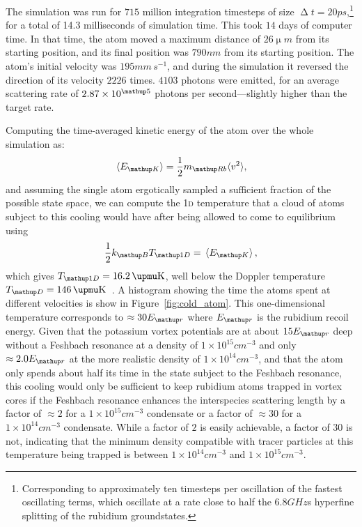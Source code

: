 The simulation was run for $715$ million integration timesteps of size $\upDelta t=20\unit{ps}$,\footnote{Corresponding to approximately ten timesteps per oscillation of the fastest oscillating terms, which oscillate at a rate close to half the $6.8\unit{GHz}$s hyperfine splitting of the rubidium groundstates.} for a total of 14.3 milliseconds of simulation time. This took $14$ days of computer time. In that time, the atom moved a maximum distance of $26\unit{\upmu m}$ from its starting position, and its final position was $790\unit{nm}$ from its starting position. The atom's initial velocity was $195 \unit{mm\,s}^{-1}$, and during the simulation it reversed the direction of its velocity $2226$ times. $4103$ photons were emitted, for an average scattering rate of $2.87\times10^\up{5}$ photons per second---slightly higher than the target rate.

Computing the time-averaged kinetic energy of the atom over the whole simulation as:
\begin{equation}
\ev{E_\up{K}} = \frac12 m_\up{Rb} \langle v^2 \rangle,
\end{equation}
and assuming the single atom ergotically sampled a sufficient fraction of the possible state space, we can compute the \textsc{1d} temperature that a cloud of atoms subject to this cooling would have after being allowed to come to equilibrium using
\begin{align}
\frac12 k_\up{B} T_\up{1D} = \ev{E_\up{K}},
\end{align}
which gives  $T_\up{1D} = 16.2\unit{\upmu K}$, well below the Doppler temperature $T_\up{D} = 146\unit{\upmu K}$~\cite{steck_rubidium_2015}. A histogram showing the time the atoms spent at different velocities is show in Figure~\ref{fig:cold_atom}. This one-dimensional temperature corresponds to $\approx30E_\up{r}$ where $E_\up{r}$ is the rubidium recoil energy. Given that the potassium vortex potentials are at about $15E_\up{r}$ deep without a Feshbach resonance at a density of $1\times10^{15}\unit{cm}^{-3}$ and only $\approx 2.0E_\up{r}$ at the more realistic density of $1\times10^{14}\unit{cm}^{-3}$, and that the atom only spends about half its time in the state subject to the Feshbach resonance, this cooling would only be sufficient to keep rubidium atoms trapped in vortex cores if the Feshbach resonance enhances the interspecies scattering length by a factor of $\approx 2$ for a $1\times10^{15}\unit{cm}^{-3}$ condensate or a factor of $\approx 30$ for a $1\times10^{14}\unit{cm}^{-3}$ condensate. While a factor of $2$ is easily achievable, a factor of $30$ is not, indicating that the minimum density compatible with tracer particles at this temperature being trapped is between $1\times10^{14}\unit{cm}^{-3}$ and $1\times10^{15}\unit{cm}^{-3}$.

